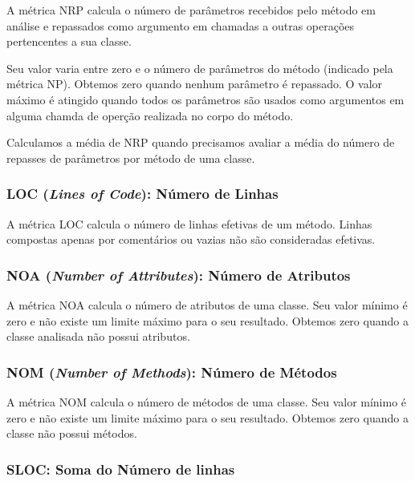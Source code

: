 A métrica NRP calcula o número de parâmetros recebidos pelo método em análise e repassados como argumento em chamadas a outras operações pertencentes a sua classe.                                                    
	
Seu valor varia entre zero e o número de parâmetros do método (indicado pela métrica NP). Obtemos zero quando nenhum parâmetro é repassado. O valor máximo é atingido quando todos os parâmetros são usados como argumentos em alguma chamda de operção realizada no corpo do método. 
                              
Calculamos a média de NRP quando precisamos avaliar a média do número de repasses de parâmetros por método de uma classe.
                        
                                                             
\subsubsection{LOC (\textit{Lines of Code}): Número de Linhas}

A métrica LOC \citep{LK94} calcula o número de linhas efetivas de um método. Linhas compostas apenas por comentários ou vazias não são consideradas efetivas.
 

\subsubsection{NOA (\textit{Number of Attributes}): Número de Atributos}

A métrica NOA calcula o número de atributos de uma classe. Seu valor mínimo é zero e não existe um limite máximo para o seu resultado. Obtemos zero quando a classe analisada não possui atributos.
                         

\subsubsection{NOM (\textit{Number of Methods}): Número de Métodos}

A métrica NOM calcula o número de métodos de uma classe. Seu valor mínimo é zero e não existe um limite máximo para o seu resultado. Obtemos zero quando a classe não possui métodos.                                                                   
                           
                                                        
\subsubsection{SLOC: Soma do Número de linhas}
                                          
